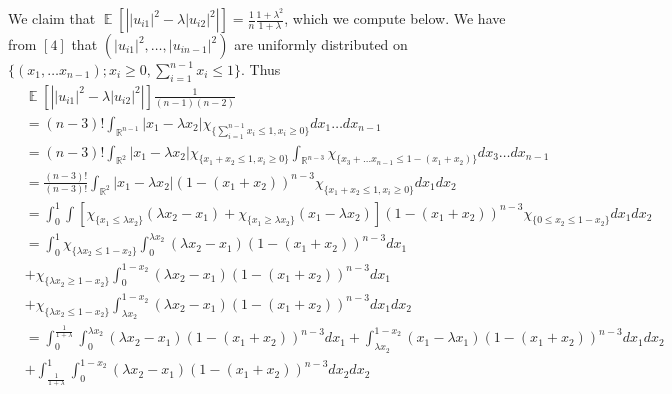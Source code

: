 \documentclass[11pt]{article}
\newcommand{\<}{\langle}
\renewcommand{\>}{\rangle}
\newcommand{\E}{\operatorname{\mathbb{E}}}
\numberwithin{equation}{section}
\begin{document}
 We claim that $\E\left[ \left| \left|u_{i1}\right|^2 - \lambda |u_{i2}|^2  \right| \right] = \frac{1}{n}\frac{1+\lambda^2}{1+\lambda}$, which we compute below. We have from $\left[4 \right]$ that $\left(|u_{i1}|^2, \ldots, |u_{i n-1}|^2 \right)$ are uniformly distributed on $\{(x_1,\ldots x_{n-1}); x_i \geq 0, \sum_{i=1}^{n-1}x_i \leq 1\}$. Thus
 \begin{align*}
& \E\left[ \left| \left|u_{i1}\right|^2 - \lambda |u_{i2}|^2  \right| \right] \frac{1}{(n-1)(n-2)}\\
&= (n-3)!\int_{\mathbb{R}^{n-1}}|x_1-\lambda x_2| \chi_{\{\sum_{i=1}^{n-1}x_i \leq 1, x_i \geq 0\}} dx_1 \ldots dx_{n-1}\\
 &= (n-3)!\int_{\mathbb{R}^2} |x_1-\lambda x_2| \chi_{\{x_1 + x_2 \leq 1, x_i \geq 0\}} \int_{\mathbb{R}^{n-3}} \chi_{\{x_3 + \ldots x_{n-1} \leq 1- (x_1 + x_2)\}} dx_3 \ldots dx_{n-1}\\
 &= \frac{(n-3)!}{(n-3)!}\int_{\mathbb{R}^2}|x_1 - \lambda x_2| (1-(x_1+x_2))^{n-3} \chi_{\{x_1+x_2 \leq 1, x_i \geq 0\}}dx_1 dx_2\\
 &=\int_{0}^{1} \int \left[ \chi_{\{x_1 \leq \lambda x_2\}}(\lambda x_2 - x_1) + \chi_{\{x_1 \geq \lambda x_2\}}(x_1-\lambda x_2)\right](1-(x_1+ x_2))^{n-3}\chi_{\{0\leq x_2 \leq 1-x_2\}} dx_1 dx_2\\
 &=\int_{0}^1 \chi_{\{\lambda x_2 \leq 1-x_2\}} \int_{0}^{\lambda x_2}(\lambda x_2 - x_1)(1-(x_1+x_2))^{n-3}dx_1 \\
 &+ \chi_{\{\lambda x_2 \geq 1-x_2\}} \int_{0}^{1-x_2} (\lambda x_2 - x_1)(1-(x_1+x_2))^{n-3} dx_1 \\
 &  +     \chi_{\{\lambda x_2 \leq 1-x_2\}} \int_{\lambda x_2}^{1-x_2} (\lambda x_2 - x_1)(1-(x_1+x_2))^{n-3} dx_1 dx_2\\
 & = \int_{0}^{\frac{1}{1+\lambda}} \int_{0}^{\lambda x_2} (\lambda x_2 - x_1)(1-(x_1+x_2))^{n-3}  dx_1 + \int_{\lambda x_2}^{1-x_2} ( x_1 - \lambda x_1)(1-(x_1+x_2))^{n-3} dx_1 dx_2 \\
 & +\int_{\frac{1}{1+\lambda}}^{1} \int_{0}^{1-x_2} (\lambda x_2 - x_1)(1-(x_1+x_2))^{n-3}  dx_2 dx_2\\
 \end{align*}
\end{document}
